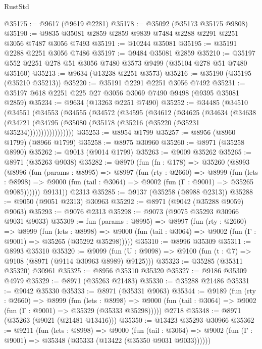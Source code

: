 \begin{lexlean}{RustStd}
\begin{coremodule}
@35175 := @9617 (@9619 @2281)
@35178 := @35092 (@35173 @35175 @9808)
@35190 := @9835 @35081 @2859 @2859 @9839 @7484 @2288 @2291 @2251 @3056 @7487 @3056 @7493
@35191 := @10244 @35081
@35195 := @35191 @2288 @2251 @3056 @7486
@35197 := @9484 @35081 @2859
@35210 := @35197 @552 @2251 @278 @51 @3056 @7480 @3573 @9499 (@35104 @278 @51 @7480 @35160)
@35213 := @9634 (@13238 @2251 @3573)
@35216 := @35190 (@35195 (@35210 @35213))
@35220 := @35191 @2291 @2251 @3056 @7492
@35231 := @35197 @618 @2251 @225 @27 @3056 @3069 @7490 @9498 (@9395 @35081 @2859)
@35234 := @9634 (@13263 @2251 @7490)
@35252 := @34485
    (@34510
      (@34551
        (@34553
          (@34555
            (@34572
              (@34595
                (@34612
                  (@34625
                    (@34634
                      (@34638
                        (@34721
                          (@34795 (@35080 (@35178 (@35216 (@35220 (@35231 @35234)))))))))))))))))
@35253 := @8954 @1799
@35257 := @8956 (@8960 @1799) (@8966 @1799)
@35258 := @8975 @30960
@35260 := @8971 (@35258 @8990)
@35262 := @9013 (@9014 @1799)
@35263 := @9009 @35262
@35265 := @8971 (@35263 @9038)
@35282 := @8970
    (fun (fn : @178) =>
    @35260
      (@8993
        (@8996
          (fun (params : @8995) =>
          @8997
            (fun (rty : @2660) =>
            @8999
              (fun (lets : @8998) =>
              @9000 (fun (tail : @3064) => @9002 (fun (Γ : @9001) => @35265 @9085))))))
        @9131))
    @2313
@35285 := @9137 (@35258 (@8988 @2313))
@35288 := @9050 (@9051 @2313) @30963
@35292 := @8971 (@9042 (@35288 @9059) @9063)
@35293 := @9076 @2313
@35298 := @9073 (@9075 @35293 @30966 @9031 @9033)
@35309 := fun (params : @8995) =>
  @8997
    (fun (rty : @2660) =>
    @8999
      (fun (lets : @8998) =>
      @9000 (fun (tail : @3064) => @9002 (fun (Γ : @9001) => @35265 (@35292 @35298)))))
@35310 := @8996 @35309
@35311 := @8993 @35310
@35320 := @9099
    (fun (U : @9098) => @9100 (fun (t : @7) => @9108 (@8971 (@9114 @30963 @8989) @9125)))
@35323 := @35285 (@35311 @35320) @30961
@35325 := @8956 @35310 @35320
@35327 := @9186 @35309 @4979
@35329 := @8971 (@35263 @21483)
@35330 := @35288 @21486
@35331 := @9042 @35330
@35333 := @8971 (@35331 @9063)
@35344 := @9189
    (fun (rty : @2660) =>
    @8999
      (fun (lets : @8998) =>
      @9000 (fun (tail : @3064) => @9002 (fun (Γ : @9001) => @35329 (@35333 @35298)))))
    @2718
@35348 := @8971 (@35263 (@9021 (@21481 @13416)))
@35350 := @13423 @35293 @30966
@35362 := @9211
    (fun (lets : @8998) =>
    @9000
      (fun (tail : @3064) =>
      @9002 (fun (Γ : @9001) => @35348 (@35333 (@13422 (@35350 @9031 @9033))))))

\end{coremodule}
\end{lexlean}
